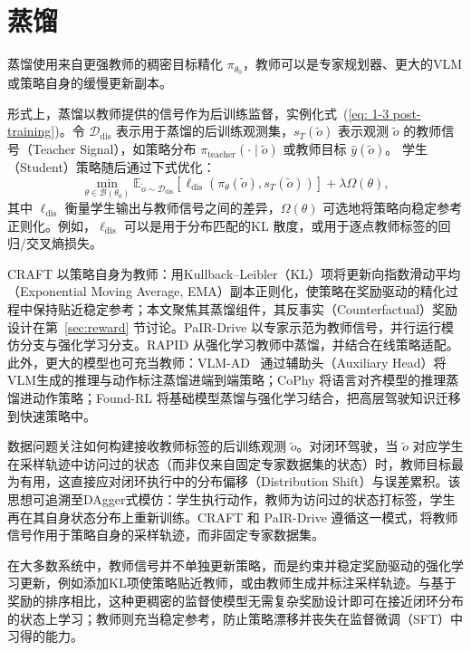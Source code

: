 \documentclass[runningheads]{llncs}
\begin{document}
\section{蒸馏}
\label{sec:distill}

蒸馏使用来自更强教师的稠密目标精化 $\pi_{\theta_0}$，教师可以是专家规划器、更大的VLM或策略自身的缓慢更新副本。


形式上，蒸馏以教师提供的信号作为后训练监督，实例化式~(\ref{eq: 1-3 post-training})。令 $\mathcal{D}_{\mathrm{dis}}$ 表示用于蒸馏的后训练观测集，$s_T(\tilde{o})$ 表示观测 $\tilde{o}$ 的教师信号（Teacher Signal），如策略分布 $\pi_{\text{teacher}}(\cdot
\mid\tilde{o})$ 或教师目标 $\hat y(\tilde o)$。
学生（Student）策略随后通过下式优化：
\begin{equation}
\min_{\theta \in \mathcal{B}(\theta_0)}
\mathbb{E}_{\tilde{o}\sim \mathcal{D}_{\mathrm{dis}}}
\left[
\ell_{\mathrm{dis}}
\left(
\pi_\theta(\tilde{o}), s_T(\tilde{o})
\right)
\right]
+
\lambda\Omega(\theta),
\label{eq:distillation_post_training}
\end{equation}
其中 $\ell_{\mathrm{dis}}$ 衡量学生输出与教师信号之间的差异，$\Omega(\theta)$ 可选地将策略向稳定参考正则化。例如，$\ell_{\mathrm{dis}}$ 可以是用于分布匹配的KL 散度，或用于逐点教师标签的回归/交叉熵损失。

CRAFT \cite{craft2026} 以策略自身为教师：用Kullback--Leibler（KL）项将更新向指数滑动平均（Exponential Moving Average, EMA）副本正则化，使策略在奖励驱动的精化过程中保持贴近稳定参考；本文聚焦其蒸馏组件，其反事实（Counterfactual）奖励设计在第~\ref{sec:reward} 节讨论。PaIR-Drive \cite{pairdrive2026} 以专家示范为教师信号，并行运行模仿分支与强化学习分支。RAPID \cite{rapid2024} 从强化学习教师中蒸馏，并结合在线策略适配。此外，更大的模型也可充当教师：VLM-AD~\cite{vlmad2026} 通过辅助头（Auxiliary Head）将VLM生成的推理与动作标注蒸馏进端到端策略；CoPhy \cite{cophy2026} 将语言对齐模型的推理蒸馏进动作策略；Found-RL \cite{foundrl2026} 将基础模型蒸馏与强化学习结合，把高层驾驶知识迁移到快速策略中。

数据问题关注如何构建接收教师标签的后训练观测 \(\tilde{o}\)。对闭环驾驶，当 \(\tilde{o}\) 对应学生在采样轨迹中访问过的状态（而非仅来自固定专家数据集的状态）时，教师目标最为有用，这直接应对闭环执行中的分布偏移（Distribution Shift）与误差累积。该思想可追溯至DAgger式模仿：学生执行动作，教师为访问过的状态打标签，学生再在其自身状态分布上重新训练。CRAFT 和 PaIR-Drive 遵循这一模式，将教师信号作用于策略自身的采样轨迹，而非固定专家数据集。

在大多数系统中，教师信号并不单独更新策略，而是约束并稳定奖励驱动的强化学习更新，例如添加KL项使策略贴近教师，或由教师生成并标注采样轨迹。与基于奖励的排序相比，这种更稠密的监督使模型无需复杂奖励设计即可在接近闭环分布的状态上学习；教师则充当稳定参考，防止策略漂移并丧失在监督微调（SFT）中习得的能力。
\end{document}
